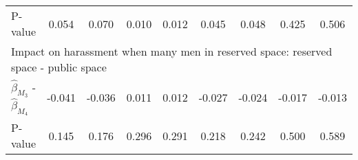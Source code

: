 \begin{tabular}{l*{8}{c}}
\quad P-value       &       0.054         &       0.070         &       0.010         &       0.012         &       0.045         &       0.048         &       0.425         &       0.506         \\
\multicolumn{9}{l}{Impact on harassment when many men in reserved space: reserved space - public space} \\\quad $\hat\beta_{M_3}$ - $\hat\beta_{M_4}$&      -0.041         &      -0.036         &       0.011         &       0.012         &      -0.027         &      -0.024         &      -0.017         &      -0.013         \\
\quad P-value       &       0.145         &       0.176         &       0.296         &       0.291         &       0.218         &       0.242         &       0.500         &       0.589         \\
\hline\hline \end{tabular}
